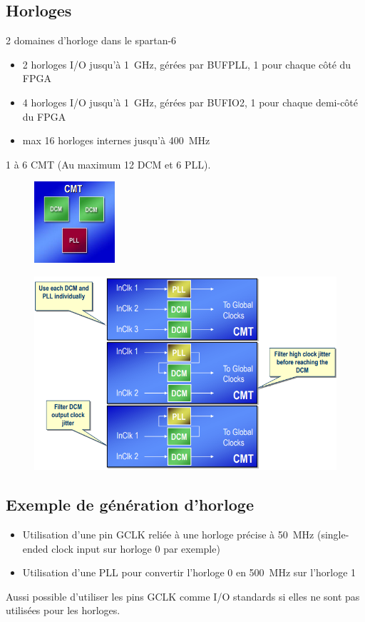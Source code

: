 \documentclass[resume]{subfiles}
\begin{document}
\subsection{Horloges}
2 domaines d'horloge dans le spartan-6
\begin{itemize}
\item 2 horloges I/O jusqu'à \SI{1}{\giga\hertz}, gérées par BUFPLL, 1 pour chaque côté du FPGA
\item 4 horloges I/O jusqu'à \SI{1}{\giga\hertz}, gérées par BUFIO2, 1 pour chaque demi-côté du FPGA
\item max 16 horloges internes jusqu'à \SI{400}{\mega\hertz}
\end{itemize}
1 à 6 CMT (Au maximum 12 DCM et 6 PLL).\\
\begin{figure}[H]
\centering
\includegraphics[width=3.00cm]{img_4.png}
\end{figure}
\begin{figure}[H]
\centering
\includegraphics[width=\columnwidth]{img_5.png}
\end{figure}


\subsection{Exemple de génération d'horloge}
\begin{itemize}
\item Utilisation d'une pin GCLK reliée à une horloge précise à \SI{50}{\mega\hertz} (single-ended clock input sur horloge 0 par exemple)
\item Utilisation d'une PLL pour convertir l'horloge 0 en \SI{500}{\mega\hertz} sur l'horloge 1
\end{itemize}
Aussi possible d'utiliser les pins GCLK comme I/O standards si elles ne sont pas utilisées pour les horloges.
\end{document}

